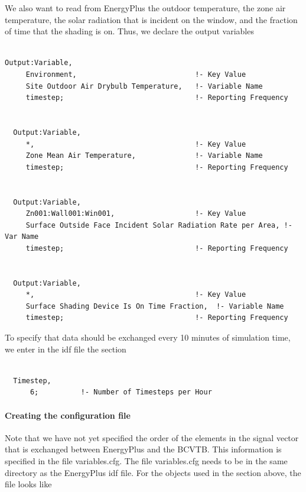 We also want to read from EnergyPlus the outdoor temperature, the zone air temperature, the solar radiation that is incident on the window, and the fraction of time that the shading is on. Thus, we declare the output variables

\begin{lstlisting}

Output:Variable,
     Environment,                            !- Key Value
     Site Outdoor Air Drybulb Temperature,   !- Variable Name
     timestep;                               !- Reporting Frequency


  Output:Variable,
     *,                                      !- Key Value
     Zone Mean Air Temperature,              !- Variable Name
     timestep;                               !- Reporting Frequency


  Output:Variable,
     Zn001:Wall001:Win001,                   !- Key Value
     Surface Outside Face Incident Solar Radiation Rate per Area, !- Var Name
     timestep;                               !- Reporting Frequency


  Output:Variable,
     *,                                      !- Key Value
     Surface Shading Device Is On Time Fraction,  !- Variable Name
     timestep;                               !- Reporting Frequency
\end{lstlisting}

To specify that data should be exchanged every 10 minutes of simulation time, we enter in the idf file the section

\begin{lstlisting}

  Timestep,
      6;          !- Number of Timesteps per Hour
\end{lstlisting}

\paragraph{\texorpdfstring{\textbf{Creating the configuration file}}{Creating the configuration file}}\label{creating-the-configuration-file-1}

Note that we have not yet specified the order of the elements in the signal vector that is exchanged between EnergyPlus and the BCVTB. This information is specified in the file variables.cfg. The file variables.cfg needs to be in the same directory as the EnergyPlus idf file. For the objects used in the section above, the file looks like

